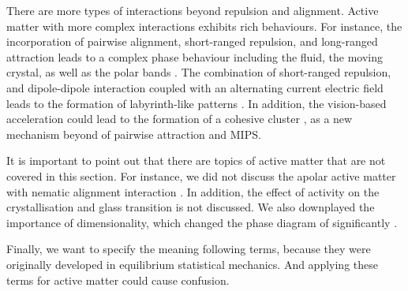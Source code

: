 \documentclass[11pt,twoside]{report}
\begin{document}
There are more types of interactions beyond repulsion and alignment. Active matter with more complex interactions exhibits rich behaviours.
For instance, the incorporation of pairwise alignment, short-ranged repulsion, and long-ranged attraction leads to a complex phase behaviour including the fluid, the moving crystal, as well as the polar bands \cite{mauleon-amieva2020}.
The combination of short-ranged repulsion, and dipole-dipole interaction coupled with an alternating current electric field leads to the formation of labyrinth-like patterns \cite{sakai2020}.
In addition, the vision-based acceleration could lead to the formation of a cohesive cluster \cite{lavergne2019}, as a new mechanism beyond of pairwise attraction and MIPS.


It is important to point out that there are topics of active matter that are not covered in this section. For instance, we did not discuss the apolar active matter with nematic alignment interaction \cite{narayan2007, chate2020, bar2020}.
In addition, the effect of activity on the crystallisation \cite{moore2021, omar2021, klamser2018} and glass transition \cite{berthier2017, klongvessa2019} is not discussed.
We also downplayed the importance of dimensionality, which changed the phase diagram of significantly \cite{omar2021, speck2022}.

Finally, we want to specify the meaning following terms, because they were originally developed in equilibrium statistical mechanics. And applying these terms for active matter could cause confusion.
\end{document}
